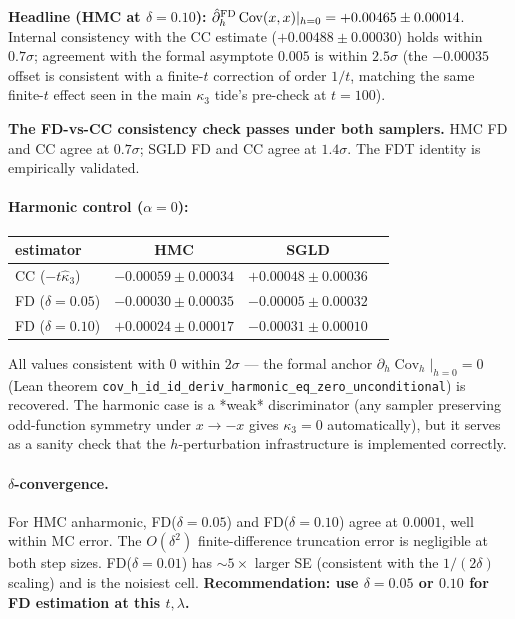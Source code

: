 \documentclass[11pt]{article}
\newcommand{\Cov}{\operatorname{Cov}}
\begin{document}
\textbf{Headline (HMC at $\delta = 0.10$):}
$\hat\partial^{\rm FD}_h \Cov(x,x)|_{h=0} = +0.00465 \pm 0.00014$.
Internal consistency with the CC estimate ($+0.00488 \pm 0.00030$)
holds within $0.7\sigma$; agreement with the formal asymptote $0.005$
is within $2.5\sigma$ (the $-0.00035$ offset is consistent with a
finite-$t$ correction of order $1/t$, matching the same
finite-$t$ effect seen in the main $\kappa_3$ tide's pre-check at
$t = 100$).

\textbf{The FD-vs-CC consistency check passes under both samplers.}
HMC FD and CC agree at $0.7\sigma$; SGLD FD and CC agree at $1.4\sigma$.
The FDT identity is empirically validated.

\paragraph{Harmonic control ($\alpha = 0$):}

\begin{center}\small
\begin{tabular}{lccc}
\toprule
estimator                     & HMC                       & SGLD                      \\
\midrule
CC ($-t \hat\kappa_3$)        & $-0.00059 \pm 0.00034$    & $+0.00048 \pm 0.00036$    \\
FD ($\delta = 0.05$)          & $-0.00030 \pm 0.00035$    & $-0.00005 \pm 0.00032$    \\
FD ($\delta = 0.10$)          & $+0.00024 \pm 0.00017$    & $-0.00031 \pm 0.00010$    \\
\bottomrule
\end{tabular}
\end{center}

All values consistent with $0$ within $2\sigma$ — the formal anchor
$\partial_h \Cov_h|_{h=0} = 0$ (Lean theorem
\texttt{cov\_h\_id\_id\_deriv\_harmonic\_eq\_zero\_unconditional}) is
recovered. The harmonic case is a *weak* discriminator (any sampler
preserving odd-function symmetry under $x \to -x$ gives $\kappa_3 = 0$
automatically), but it serves as a sanity check that the
$h$-perturbation infrastructure is implemented correctly.

\paragraph{$\delta$-convergence.} For HMC anharmonic, FD($\delta = 0.05$)
and FD($\delta = 0.10$) agree at $0.0001$, well within MC error. The
$O(\delta^2)$ finite-difference truncation error is negligible at
both step sizes. FD($\delta = 0.01$) has $\sim 5{\times}$ larger SE
(consistent with the $1/(2\delta)$ scaling) and is the noisiest cell.
\textbf{Recommendation: use $\delta = 0.05$ or $0.10$ for FD
estimation at this $t, \lambda$.}
\end{document}
